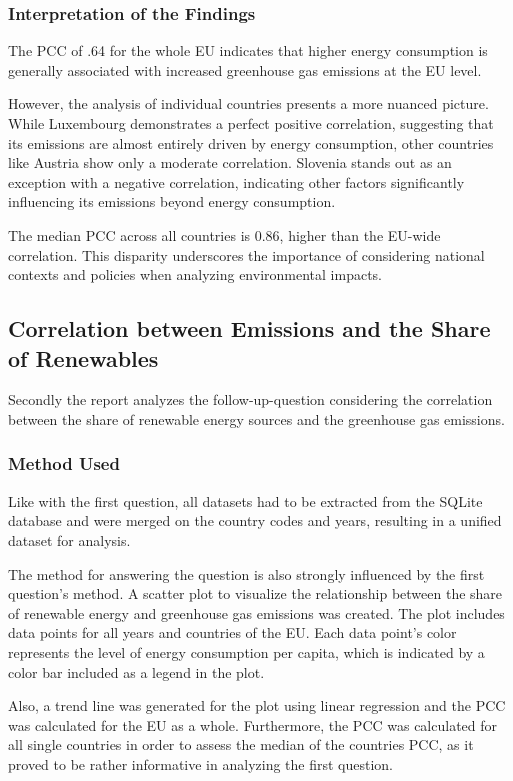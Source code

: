 \documentclass{article}
\begin{document}
\subsubsection*{Interpretation of the Findings}
The PCC of .64 for the whole EU indicates that higher energy consumption is generally associated with increased greenhouse gas emissions at the EU level.

However, the analysis of individual countries presents a more nuanced picture. While Luxembourg demonstrates a perfect positive correlation,
suggesting that its emissions are almost entirely driven by energy consumption, other countries like Austria show only a moderate correlation.
Slovenia stands out as an exception with a negative correlation, indicating other factors significantly influencing its emissions beyond energy consumption.

The median PCC across all countries is 0.86, higher than the EU-wide correlation. This disparity underscores the importance of considering national contexts
and policies when analyzing environmental impacts.

\subsection*{Correlation between Emissions and the Share of Renewables}
Secondly the report analyzes the follow-up-question considering the correlation between the share of renewable energy sources and the greenhouse
gas emissions.

\subsubsection*{Method Used}
Like with the first question, all datasets had to be extracted from the SQLite database and were merged on the country codes
and years, resulting in a unified dataset for analysis.

The method for answering the question is also strongly influenced by the first question's method.
A scatter plot to visualize the relationship between the share of renewable energy and greenhouse gas emissions was created.
The plot includes data points for all years and countries of the EU. Each data point's color represents the level of energy consumption per capita,
which is indicated by a color bar included as a legend in the plot.

Also, a trend line was generated for the plot using linear regression and the PCC was calculated for the EU as a whole.
Furthermore, the PCC was calculated for all single countries in order to assess the median of the countries PCC, as it proved to be
rather informative in analyzing the first question.
\end{document}

